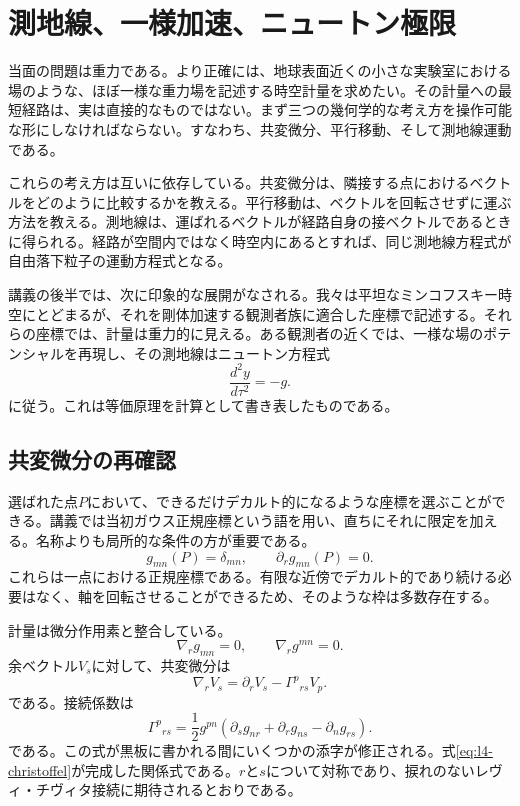 \chapter{測地線、一様加速、ニュートン極限}

当面の問題は重力である。より正確には、地球表面近くの小さな実験室における場のような、ほぼ一様な重力場を記述する時空計量を求めたい。その計量への最短経路は、実は直接的なものではない。まず三つの幾何学的な考え方を操作可能な形にしなければならない。すなわち、共変微分、平行移動、そして測地線運動である。

これらの考え方は互いに依存している。共変微分は、隣接する点におけるベクトルをどのように比較するかを教える。平行移動は、ベクトルを回転させずに運ぶ方法を教える。測地線は、運ばれるベクトルが経路自身の接ベクトルであるときに得られる。経路が空間内ではなく時空内にあるとすれば、同じ測地線方程式が自由落下粒子の運動方程式となる。

講義の後半では、次に印象的な展開がなされる。我々は平坦なミンコフスキー時空にとどまるが、それを剛体加速する観測者族に適合した座標で記述する。それらの座標では、計量は重力的に見える。ある観測者の近くでは、一様な場のポテンシャルを再現し、その測地線はニュートン方程式
\begin{equation}
\frac{d^2y}{d\tau^2}=-g.
\end{equation}
に従う。これは等価原理を計算として書き表したものである。

\section{共変微分の再確認}

選ばれた点\(P\)において、できるだけデカルト的になるような座標を選ぶことができる。講義では当初ガウス正規座標という語を用い、直ちにそれに限定を加える。名称よりも局所的な条件の方が重要である。
\begin{equation}
g_{mn}(P)=\delta_{mn},
\qquad
\partial_r g_{mn}(P)=0.
\label{eq:l4-normal-point}
\end{equation}
これらは一点における正規座標である。有限な近傍でデカルト的であり続ける必要はなく、軸を回転させることができるため、そのような枠は多数存在する。

計量は微分作用素と整合している。
\begin{equation}
\nabla_r g_{mn}=0,
\qquad
\nabla_r g^{mn}=0.
\label{eq:l4-metric-compatibility}
\end{equation}
余ベクトル\(V_s\)に対して、共変微分は
\begin{equation}
\nabla_r V_s
=
\partial_r V_s-\Gamma^p{}_{rs}V_p.
\label{eq:l4-covector-derivative}
\end{equation}
である。接続係数は
\begin{equation}
\Gamma^p{}_{rs}
=
\frac{1}{2}g^{pn}
\left(
\partial_s g_{nr}
+\partial_r g_{ns}
-\partial_n g_{rs}
\right).
\label{eq:l4-christoffel}
\end{equation}
である。この式が黒板に書かれる間にいくつかの添字が修正される。式\eqref{eq:l4-christoffel}が完成した関係式である。\(r\)と\(s\)について対称であり、捩れのないレヴィ・チヴィタ接続に期待されるとおりである。

